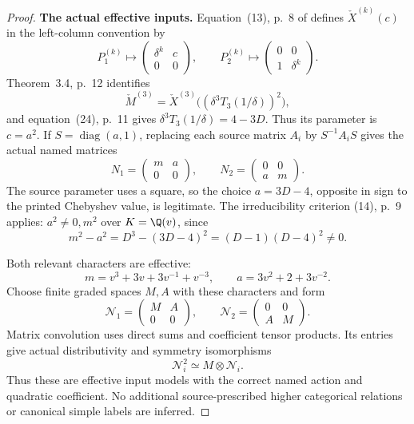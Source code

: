 \begin{proof}
\par\smallskip\noindent\textbf{The actual effective inputs.}\quad
Equation~(13), p.~8 of \cite{BlasiakChebyshev}
defines \(\check X^{(k)}(c)\) in the left-column
convention by
\[
 P_1^{(k)}\longmapsto
   \begin{pmatrix}\delta^k&c\\0&0\end{pmatrix},
 \qquad
 P_2^{(k)}\longmapsto
   \begin{pmatrix}0&0\\1&\delta^k\end{pmatrix}.
\]
Theorem~3.4, p.~12 identifies
\[
 \check M^{(3)}
 =\check X^{(3)}\bigl((\delta^3T_3(1/\delta))^2\bigr),
\]
and equation~(24), p.~11 gives
\(\delta^3T_3(1/\delta)=4-3D\).
Thus its parameter is \(c=a^2\).
If \(S=\operatorname{diag}(a,1)\), replacing
each source matrix \(A_i\) by \(S^{-1}A_iS\)
gives the actual named matrices
\begin{equation}\label{eq:sixTensorPositiveInputs}
 N_1=\begin{pmatrix}m&a\\0&0\end{pmatrix},\qquad
 N_2=\begin{pmatrix}0&0\\a&m\end{pmatrix}.
\end{equation}
The source parameter uses a square, so the
choice \(a=3D-4\), opposite in sign to the
printed Chebyshev value, is legitimate.
The irreducibility criterion (14), p.~9 applies:
\(a^2\ne0,m^2\) over \(K=\Q(v)\), since
\begin{equation}\label{eq:sixTensorSimpleFactor}
 m^2-a^2=D^3-(3D-4)^2=(D-1)(D-4)^2\ne0.
\end{equation}

Both relevant characters are effective:
\[
 m=v^3+3v+3v^{-1}+v^{-3},\qquad
 a=3v^2+2+3v^{-2}.
\]
Choose finite graded spaces \(M,A\) with these
characters and form
\[
 \mathcal N_1=\begin{pmatrix}M&A\\0&0\end{pmatrix},\qquad
 \mathcal N_2=\begin{pmatrix}0&0\\A&M\end{pmatrix}.
\]
Matrix convolution uses direct sums and coefficient
tensor products. Its entries give actual
distributivity and symmetry isomorphisms
\begin{equation}\label{eq:sixTensorInputQuadratic}
              \mathcal N_i^2\simeq M\otimes\mathcal N_i.
\end{equation}
Thus these are effective input models with
the correct named action and quadratic coefficient.
No additional source-prescribed higher categorical
relations or canonical simple labels are inferred.


\end{proof}
